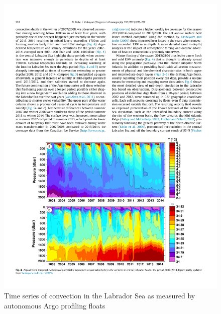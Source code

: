 \begin{figure}[hbt]
  \begin{center}
    \includegraphics{figs/WaterMasses/KiekeYashayaev15}
    \caption{Time series of convection in the Labrador Sea as measured by autonomous Argo profiling floats \citep{kiekeyashayaev15}}
    \label{fig:KiekeYashayaev15}  
  \end{center}
\end{figure}


